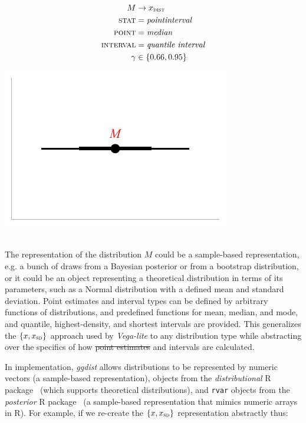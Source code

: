 \documentclass[journal]{vgtc}                     %
\newcommand{\equationfigure}[2]{%
\noindent
\begin{minipage}{.5\columnwidth}
\setlength{\abovedisplayskip}{0pt} %
\setlength{\belowdisplayskip}{0pt} %
#1\end{minipage}%
\begin{minipage}{.4\columnwidth}\centering #2 \end{minipage}%
\vspace{.5\belowdisplayskip}\\
}
\providecommand{\DIFadd}[1]{{\protect\color{blue}\uwave{#1}}} %
\providecommand{\DIFdel}[1]{{\protect\color{red}\sout{#1}}}                      %
\providecommand{\DIFaddbegin}{} %
\providecommand{\DIFaddend}{} %
\providecommand{\DIFdelbegin}{} %
\providecommand{\DIFdelend}{} %
\begin{document}
\equationfigure{
\begin{align*}
M &\rightarrow x_\textsc{dist}\\
\textsc{stat} &= \mathit{pointinterval}\\
\textsc{point} &= \mathit{median}\\
\textsc{interval} &= \textit{quantile interval}\\
\gamma &\in \{0.66, 0.95\}
\end{align*}
}{\includegraphics[width=1.2\columnwidth]{figs/3-stat_pointinterval_A.pdf}}
The representation of the distribution $M$ could be a sample-based representation, e.g. a bunch of draws from a Bayesian posterior or from a bootstrap distribution, or it could be an object representing a theoretical distribution in terms of its parameters, such as a Normal distribution with a defined mean and standard deviation. Point estimates and interval types can be defined by arbitrary functions of distributions, and predefined functions for mean, median, and mode, and quantile, highest-density, and shortest intervals are provided. This generalizes the $\{x, x_\textsc{sd}\}$ approach used by \textit{Vega-lite} to any distribution type while abstracting over the specifics of how \DIFdelbegin \DIFdel{point estimates }\DIFdelend \DIFaddbegin \DIFadd{points }\DIFaddend and intervals are calculated.

In implementation, \textit{ggdist} allows distributions to be represented by numeric vectors (a sample-based representation), objects from the \textit{distributional } R package~\cite{oharawild2022distributional} (which supports theoretical distributions), and \texttt{rvar} objects from the \textit{posterior} R package~\cite{burkner2022posterior} (a sample-based representation that mimics numeric arrays in R). For example, if we re-create the $\{x, x_\textsc{sd}\}$ representation abstractly thus:
\end{document}
